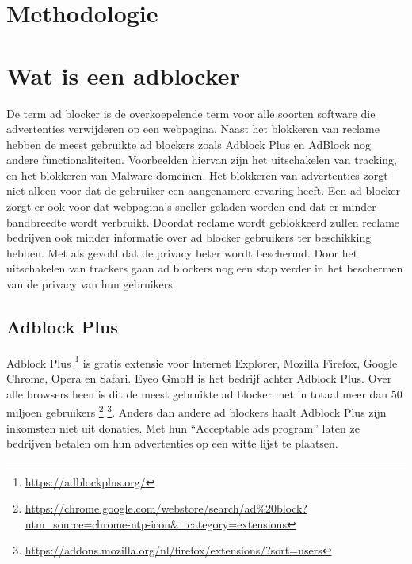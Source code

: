 \documentclass[pdftex,a4paper,12pt,twoside]{report}
\begin{document}
\chapter{Methodologie}
\label{ch:methodologie}



\chapter{Wat is een adblocker}
\label{ch:Wat is een adblocker}
De term ad blocker is de overkoepelende term voor alle soorten software die advertenties verwijderen op een webpagina. Naast het blokkeren van reclame hebben de meest gebruikte ad blockers zoals Adblock Plus en AdBlock nog andere functionaliteiten. Voorbeelden hiervan zijn het uitschakelen van tracking, en het blokkeren van Malware domeinen. Het blokkeren van advertenties zorgt niet alleen voor dat de gebruiker een aangenamere ervaring heeft. Een ad blocker zorgt er ook voor dat webpagina's sneller geladen worden end dat er minder bandbreedte wordt verbruikt. Doordat reclame wordt geblokkeerd zullen reclame bedrijven ook minder informatie over ad blocker gebruikers ter beschikking hebben. Met als gevold dat de privacy beter wordt beschermd. Door het uitschakelen van \glspl{tracker} gaan ad blockers nog een stap verder in het beschermen van de privacy van hun gebruikers.

\section{Adblock Plus}
\label{sec:Adblock Plus}
Adblock Plus \footnote{\url{https://adblockplus.org/}} is gratis extensie voor Internet Explorer, Mozilla Firefox, Google Chrome, Opera en Safari. Eyeo GmbH is het bedrijf achter Adblock Plus. Over alle browsers heen is dit de meest gebruikte ad blocker met in totaal meer dan 50 miljoen gebruikers \footnote{\url{https://chrome.google.com/webstore/search/ad\%20block?utm_source=chrome-ntp-icon&_category=extensions}} \footnote{\url{https://addons.mozilla.org/nl/firefox/extensions/?sort=users}}. Anders dan andere ad blockers haalt Adblock Plus zijn inkomsten niet uit donaties. Met hun "`Acceptable ads program"' laten ze bedrijven betalen om hun advertenties op een witte lijst te plaatsen. 
\end{document}
